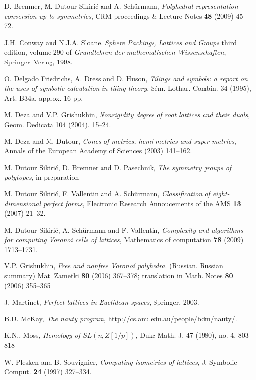 \documentclass[12pt]{amsart}
\begin{document}
\begin{thebibliography}{99}


D. Bremner, M. Dutour Sikiri\'c and A. Sch\"urmann, \textit{Polyhedral representation conversion up to symmetries}, CRM proceedings \& Lecture Notes {\bf 48} (2009) 45--72.


J.H. Conway and N.J.A. Sloane, \textit{Sphere Packings, Lattices and Groups} third edition, volume 290 of \textit{Grundlehren der mathematischen Wissenschaften}, Springer--Verlag, 1998.

O. Delgado Friedrichs, A. Dress and D. Huson,
{\em Tilings and symbols: a report on the uses of symbolic calculation in tiling
theory}, S\'em. Lothar. Combin. 34 (1995), Art. B34a, approx. 16 pp.


M. Deza and V.P. Grishukhin, {\em Nonrigidity degree of root lattices and their duals}, Geom. Dedicata 104 (2004), 15–24.

M. Deza and M. Dutour, {\em Cones of metrics, hemi-metrics and super-metrics}, Annals of the European Academy of Sciences (2003) 141--162.

M. Dutour Sikiri\'c, D. Bremner and D. Pasechnik,
{\em The symmetry groups of polytopes}, in preparation


M. Dutour Sikiri\'c, F. Vallentin and A. Sch\"urmann, {\em Classification of eight-dimensional perfect forms}, Electronic Research Annoucements of the AMS {\bf 13} (2007) 21--32.


M. Dutour Sikiri\'c, A. Sch\"urmann and F. Vallentin, {\em Complexity and algorithms for computing Voronoi cells of lattices}, Mathematics of computation {\bf 78} (2009) 1713--1731.


V.P. Grishukhin, {\em Free and nonfree Voronoĭ polyhedra}.
(Russian. Russian summary) Mat. Zametki {\bf 80} (2006) 367--378;
translation in Math. Notes {\bf 80} (2006) 355–365

J. Martinet, \textit{Perfect lattices in Euclidean spaces}, Springer, 2003.


B.D. McKay, \textit{The nauty program}, \url{http://cs.anu.edu.au/people/bdm/nauty/}.


K.N., Moss, {\em Homology of $SL(n,Z[1/p])$}, Duke Math. J. 47 (1980), no. 4, 803–818



W. Plesken and B. Souvignier,
\textit{Computing isometries of lattices},
J. Symbolic Comput. {\bf 24} (1997) 327--334.




\end{thebibliography}
\end{document}
